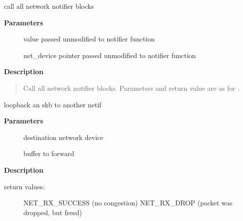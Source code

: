 \documentclass[a4paper,8pt,english]{sphinxmanual}
\begin{document}
\begin{fulllineitems}
\label{networking/kapi:c.call_netdevice_notifiers}
call all network notifier blocks

\end{fulllineitems}


\textbf{Parameters}
\begin{description}
\item[{}] \leavevmode
value passed unmodified to notifier function

\item[{}] \leavevmode
net\_device pointer passed unmodified to notifier function

\end{description}

\textbf{Description}
\begin{quote}

Call all network notifier blocks.  Parameters and return value
are as for .
\end{quote}

\begin{fulllineitems}
\label{networking/kapi:c.dev_forward_skb}
loopback an skb to another netif

\end{fulllineitems}


\textbf{Parameters}
\begin{description}
\item[{}] \leavevmode
destination network device

\item[{}] \leavevmode
buffer to forward

\end{description}

\textbf{Description}
\begin{description}
\item[{return values:}] \leavevmode
NET\_RX\_SUCCESS  (no congestion)
NET\_RX\_DROP     (packet was dropped, but freed)

\end{description}
\end{document}
